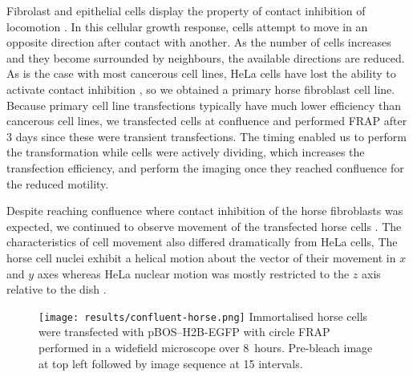 
    Fibrolast and epithelial cells display the property of contact
    inhibition of locomotion \citep{abercrombie1970contact}.
    In this cellular growth response, cells attempt to move in an
    opposite direction after contact with another.  As the number of
    cells increases and they become surrounded by neighbours, the
    available directions are reduced.
    As is the case with most cancerous cell lines, HeLa cells have
    lost the ability to activate contact inhibition
    \citep{stephenson1982locomotory},
    so we obtained a primary horse fibroblast cell line.
    Because primary cell line transfections typically have much lower
    efficiency than cancerous cell lines, we transfected cells at
     confluence and performed FRAP after 3 days since these
    were transient transfections.
    The timing enabled us to perform the transformation while cells
    were actively dividing, which increases the transfection
    efficiency, and perform the imaging once they reached confluence for the
    reduced motility.

    Despite reaching confluence where contact inhibition
    of the horse fibroblasts was expected,
    we continued to observe movement of the transfected
    horse cells .
    The characteristics of cell movement also
    differed dramatically from HeLa cells,
    The horse cell nuclei exhibit a helical motion
    about the vector of their movement
    in $x$ and $y$ axes 
    whereas HeLa nuclear motion was mostly
    restricted to the $z$ axis relative to
    the dish .

    \begin{figure}
      \centering
      \texttt{[image: results/confluent-horse.png]}
        {
          Immortalised horse cells were transfected with pBOS--H2B-EGFP
          with circle FRAP performed in a widefield microscope over 8~hours.
          Pre-bleach image at top left followed by
          image sequence at \SI{15}{\min} intervals.
        }
      \label{fig:kill-frap:confluent-horse}
    \end{figure}

